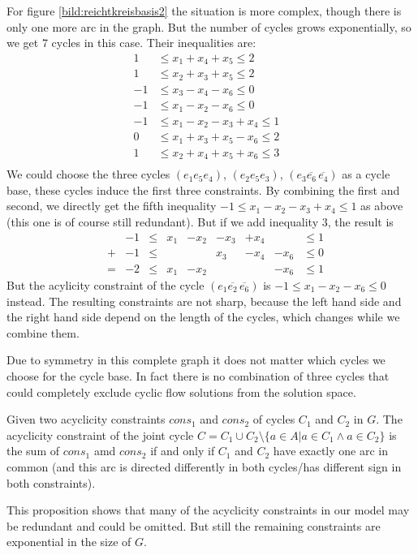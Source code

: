 For figure \ref{bild:reichtkreisbasis2} the situation is more complex, though there is only one more arc in the graph. 
But the number of cycles grows exponentially, so we get 7 cycles in this case. Their inequalities are:
\begin{align*}
 1 &\le x_1+x_4+x_5\le 2&\\
 1&\le x_2+x_3+x_5\le 2& \\%
 -1&\le x_3-x_4-x_6\le 0\\
 -1&\le x_1-x_2-x_6\le 0\\ 
 -1 &\le x_1-x_2-x_3+x_4 \le 1&\\
 0 &\le x_1+x_3+x_5-x_6\le 2\\
 1&\le x_2+x_4+x_5+x_6\le 3\\
\end{align*}
We could choose the three cycles $(e_1 e_5 e_4)$, $(e_2 e_5 e_3)$, $(e_3 \overline{e_6}\, \overline{e_4})$ as a cycle 
base, these cycles induce the first three constraints. By combining the first and second, we directly get the fifth 
inequality $-1 \le x_1-x_2-x_3+x_4 \le 1$ as above (this one is of course still redundant). But if we add inequality 
$3$, the result is 
\begin{align*}
 &&-1 &\le &x_1&-x_2&-x_3&+x_4 &&\le 1\\
 &+&-1&\le &&&x_3&-x_4&-x_6&\le 0\\
 &=&-2&\le&x_1&-x_2&&&-x_6&\le 1
\end{align*}
But the acylicity constraint of the cycle $(e_1 \overline{e_2} \,\overline{e_6})$ is $-1\le x_1-x_2-x_6\le 0$ instead. 
The resulting constraints are not sharp, because the left hand side and the right hand side depend on the length of the 
cycles, which changes while we combine them.

Due to symmetry in this complete graph it does not matter which cycles we choose for the cycle base. In fact there is 
no combination of three cycles that could completely exclude cyclic flow solutions from the solution space.

\begin{prop}
\label{prop:redundantAcyclicityCons}
 Given two acyclicity constraints $cons_1$ and $cons_2$ of cycles $C_1$ and $C_2$ in $G$. The acyclicity constraint of 
the joint cycle $C=C_1\cup C_2 \setminus \{a\in A| a\in C_1\land a\in C_2 \}$ is the sum of $cons_1$ amd $cons_2$ if 
and only if $C_1$ and $C_2$ have exactly one arc in common (and this arc is directed differently in both 
cycles/has different sign in both constraints).
\end{prop}
This proposition shows that many of the acyclicity constraints in our model may be redundant and could be omitted. 
But still the remaining constraints are exponential in the size of $G$.

